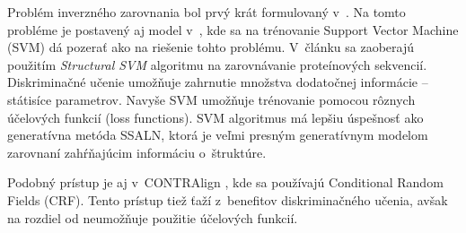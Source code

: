 Problém inverzného zarovnania bol prvý krát formulovaný v~\cite{inverseAlign1}.
Na tomto probléme je postavený aj model v~\cite{svmTrainingProteinsAlignment}, kde sa na trénovanie Support Vector Machine (SVM) dá pozerať ako na riešenie tohto problému. V~článku sa zaoberajú použitím \textit{Structural SVM} algoritmu na zarovnávanie proteínových sekvencií. Diskriminačné učenie umožňuje zahrnutie množstva dodatočnej informácie -- státisíce parametrov.
Navyše SVM umožňuje trénovanie pomocou rôznych účelových funkcií (loss functions).
SVM algoritmus má lepšiu úspešnosť ako generatívna metóda SSALN, ktorá je veľmi presným generatívnym modelom zarovnaní zahŕňajúcim informáciu o~štruktúre.

Podobný prístup je aj v~CONTRAlign \cite{contralign}, kde sa používajú Conditional Random Fields (CRF). Tento prístup tiež ťaží z~benefitov diskriminačného učenia, avšak na rozdiel od \cite{svmTrainingProteinsAlignment} neumožňuje použitie účelových funkcií.
